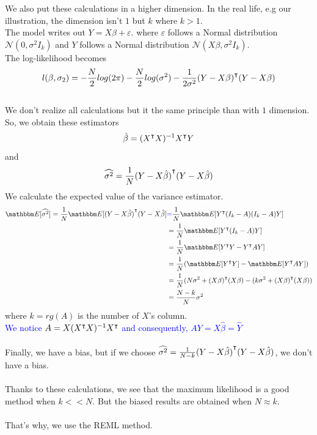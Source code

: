 \documentclass{article}
\begin{document}
We also put these calculations in a higher dimension. In the real life, e.g our illustration, the dimension isn't $1$ but $k$ where $k>1$.\\
The model writes out $Y=X \beta + \varepsilon$.
where $\varepsilon$ follows a Normal distribution $\mathcal{N}(0, \sigma^2 I_k)$ and $Y$ follows a Normal distribution $\mathcal{N}(X\beta, \sigma^2I_k)$.\\
The log-likelihood becomes 
\[ l(\beta, \sigma_2) = -\frac{N}{2}log(2\pi)-\frac{N}{2} log(\sigma^2)-\frac{1}{2\sigma^2}{(Y-X\beta)}^\intercal(Y-X\beta) \]
\\
We don't realize all calculations but it the same principle than with $1$ dimension. So, we obtain these estimators \\
\[ \hat{\beta} = ({X}^\intercal{X})^{-1}{X}^\intercal Y \] and \[ \widehat{\sigma^2} = \frac{1}{N}{(Y-X\hat{\beta})}^\intercal(Y-X\hat{\beta})\]
We calculate the expected value of the variance estimator.
\begin{equation*}
    \begin{split}
       \esp[\widehat{\sigma^2}]=\frac{1}{N}\esp[\trans{(Y-X\hat{\beta})}(Y-X\hat{\beta}]
       &\textcolor{blue}{=} \frac{1}{N}\esp[\trans{Y}(I_k-A)(I_k-A)Y]\\
       &= \frac{1}{N}\esp[\trans{Y}(I_k-A)Y]\\
       &= \frac{1}{N}\esp[\trans{Y}Y-\trans{Y}AY]\\
       &= \frac{1}{N}(\esp[\trans{Y}Y]-\esp[\trans{Y}AY])\\
       &= \frac{1}{N}(N\sigma^2+\trans{(X\beta)}(X\beta)-(k\sigma^2+\trans{(X\beta)}(X\beta))\\
       &= \frac{N-k}{N}\sigma^2
    \end{split}
\end{equation*}
where $k=rg(A)$ is the number of $X$'s column.\\
\textcolor{blue}{We notice $A=X({X}^\intercal X)^{-1}{X}^\intercal$ and consequently, $AY=X\hat{\beta} = \hat{Y}$}\\
\\
Finally, we have a bias, but if we choose $\widehat{\sigma^2}=\frac{1}{N-k}{(Y-X\hat{\beta})}^\intercal(Y-X\hat{\beta})$, we don't have a bias.\\
\\
Thanks to these calculations, we see that the maximum likelihood is a good method when $k << N$. But the biased results are obtained when $N\approx k$.\\
\\
That's why, we use the REML method.
\end{document}
